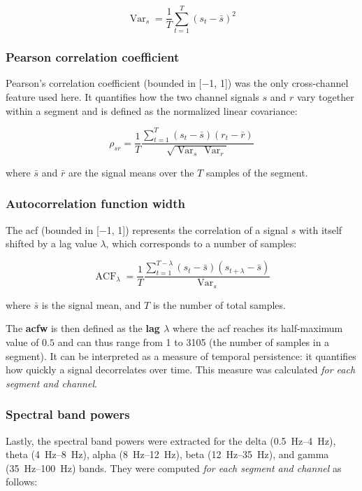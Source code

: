 \begin{equation}
    \label{eq:variance}
    \operatorname{Var}_s = \frac{1}{T} \sum_{t=1}^{T} \left(s_t-\bar{s}\right)^2
\end{equation}

\subsubsection{Pearson correlation coefficient}
Pearson's correlation coefficient (bounded in [\num{-1}, \num{1}]) was the only cross-channel feature used here.
It quantifies how the two channel signals $s$ and $r$ vary together within a segment and is defined as the normalized linear covariance:

\begin{equation}
    \label{eq:pearson-correlation}
    \rho_{sr} =
    \frac{1}{T}
    \frac{\sum_{t=1}^{T} \left(s_t-\bar{s}\right)\left(r_t-\bar{r}\right)}{\sqrt{\operatorname{Var}_s\,\operatorname{Var}_r}}
\end{equation}

where $\bar{s}$ and $\bar{r}$ are the signal means over the $T$ samples of the segment.

\subsubsection{Autocorrelation function width}
The \gls{acf} (bounded in [\num{-1}, \num{1}]) represents the correlation of a signal $s$ with itself shifted by a lag value $\lambda$, which corresponds to a number of samples:

\begin{equation}
    \label{eq:acf}
    \operatorname{ACF}_\lambda =
    \frac{1}{T} \frac    {\sum_{t=1}^{T-\lambda}\left(s_t-\bar{s}\right)\left(s_{t+\lambda}-\bar{s}\right)}{\operatorname{Var}_s}
\end{equation}

where $\bar{s}$ is the signal mean, and $T$ is the number of total samples.

The \textbf{\gls{acfw}} is then defined as the \textbf{lag $\lambda$} where the \gls{acf} reaches its half-maximum value of $0.5$ and can thus range from 1 to 3105 (the number of samples in a segment).
It can be interpreted as a measure of temporal persistence: it quantifies how quickly a signal decorrelates over time.
This measure was calculated \textit{for each segment and channel}.

\subsubsection{Spectral band powers}
{
Lastly, the spectral band powers were extracted for the delta (\SIrange{0.5}{4}{\hertz}), theta (\SIrange{4}{8}{\hertz}), alpha (\SIrange{8}{12}{\hertz}), beta (\SIrange{12}{35}{\hertz}), and gamma (\SIrange{35}{100}{\hertz}) bands.
They were computed \textit{for each segment and channel} as follows:}

